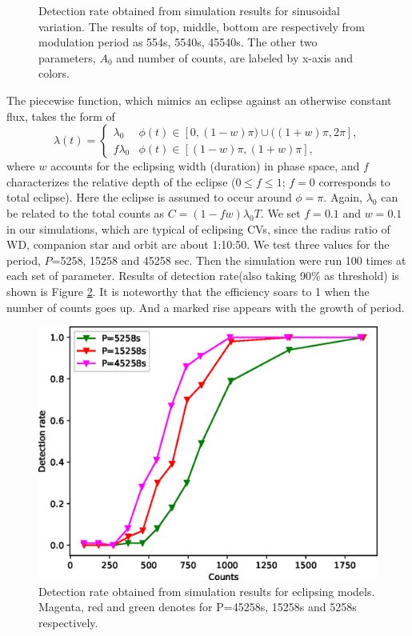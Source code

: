 \documentclass[fleqn,usenatbib]{mnras}
\begin{document}
\begin{figure}
\begin{minipage}[b]{0.45\textwidth}
\end{minipage}
\caption{Detection rate obtained from simulation results for sinusoidal variation. The results of top, middle, bottom are respectively from modulation period as 554s, 5540s, 45540s. The other two parameters, $A_{0}$ and number of counts, are labeled by x-axis and colors. \label{fig:detection}}
\end{figure}

The piecewise function, which mimics an eclipse against an otherwise constant flux, takes the form of
\begin{equation}
\lambda(t)=
\begin{cases}
\lambda_0 & \text{$\phi(t) \in[0,(1-w)\pi)\cup ((1+w)\pi,2\pi]$},\\
f\lambda_0 & \text{$\phi(t) \in[(1-w)\pi,(1+w)\pi]$},
\end{cases}	
\end{equation}
where $w$ accounts for the eclipsing width (duration) in phase space, and $f$ characterizes the relative depth of the eclipse ($0\leq f \leq 1$; $f = 0$ corresponds to total eclipse). Here the eclipse is assumed to occur around $\phi = \pi$. 
Again, $\lambda_0$ can be related to the total counts as $C=(1-fw)\lambda_0T$.
We set $f=0.1$ and $w=0.1$ in our simulations, which are typical of eclipsing CVs, since the radius ratio of WD, companion star and orbit are about 1:10:50. 
We test three values for the period, $P$=5258, 15258 and 45258 sec. 
Then the simulation were run 100 times at each set of parameter. Results of detection rate(also taking 90\% as threshold) is shown is Figure \ref{fig:eclipse}. It is noteworthy that the efficiency soars to 1 when the number of counts goes up. And a marked rise appears with the growth of period.
 
\begin{figure}
\centering
\includegraphics[scale=0.61]{./figure/sim_LW/eclipse_cut.eps}
\caption{Detection rate obtained from simulation results for eclipsing models. Magenta, red and green denotes for P=45258s, 15258s and 5258s respectively. }\label{fig:eclipse}
\end{figure}
\end{document}
